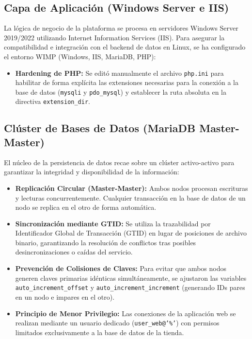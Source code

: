 \documentclass[12pt,a4paper]{article}
\begin{document}
\subsection{Capa de Aplicación (Windows Server e IIS)}
La lógica de negocio de la plataforma se procesa en servidores Windows Server 2019/2022 utilizando Internet Information Services (IIS). Para asegurar la compatibilidad e integración con el backend de datos en Linux, se ha configurado el entorno WIMP (Windows, IIS, MariaDB, PHP):
\begin{itemize}
    \item \textbf{Hardening de PHP:} Se editó manualmente el archivo \texttt{php.ini} para habilitar de forma explícita las extensiones necesarias para la conexión a la base de datos (\texttt{mysqli} y \texttt{pdo\_mysql}) y establecer la ruta absoluta en la directiva \texttt{extension\_dir}.
\end{itemize}

\subsection{Clúster de Bases de Datos (MariaDB Master-Master)}
El núcleo de la persistencia de datos recae sobre un clúster activo-activo para garantizar la integridad y disponibilidad de la información:
\begin{itemize}
    \item \textbf{Replicación Circular (Master-Master):} Ambos nodos procesan escrituras y lecturas concurrentemente. Cualquier transacción en la base de datos de un nodo se replica en el otro de forma automática.
    \item \textbf{Sincronización mediante GTID:} Se utiliza la trazabilidad por Identificador Global de Transacción (GTID) en lugar de posiciones de archivo binario, garantizando la resolución de conflictos tras posibles desincronizaciones o caídas del servicio.
    \item \textbf{Prevención de Colisiones de Claves:} Para evitar que ambos nodos generen claves primarias idénticas simultáneamente, se ajustaron las variables \texttt{auto\_increment\_offset} y \texttt{auto\_increment\_increment} (generando IDs pares en un nodo e impares en el otro).
    \item \textbf{Principio de Menor Privilegio:} Las conexiones de la aplicación web se realizan mediante un usuario dedicado (\texttt{user\_web@'\%'}) con permisos limitados exclusivamente a la base de datos de la tienda.
\end{itemize}
\end{document}
